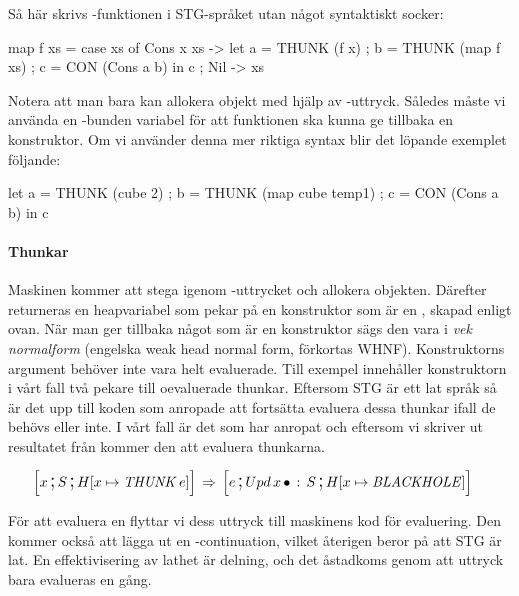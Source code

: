\documentclass[../Core]{subfiles}
\begin{document}
Så här skrivs -funktionen i STG-språket utan något syntaktiskt socker:

\begin{codeEx}
map f xs = case xs of
    { Cons x xs -> let { a = THUNK (f x)
                       ; b = THUNK (map f xs)
                       ; c = CON (Cons a b)
                       } in c
    ; Nil       -> xs
    }
\end{codeEx}

Notera att man bara kan allokera objekt med hjälp av -uttryck. Således
måste vi använda en -bunden variabel  för att funktionen ska kunna ge tillbaka en konstruktor.
Om vi använder denna mer riktiga syntax blir det löpande exemplet följande:

\begin{codeEx}
let { a = THUNK (cube 2)
    ; b = THUNK (map cube temp1)
    ; c = CON (Cons a b)
    } in c
\end{codeEx}

\paragraph{Thunkar} Maskinen kommer att stega igenom -uttrycket och allokera objekten.
Därefter returneras en heapvariabel som pekar på en konstruktor
som är en , skapad enligt ovan. När man ger tillbaka något som är
en konstruktor sägs den vara i \emph{vek normalform} (engelska weak head normal form, förkortas WHNF). Konstruktorns
argument behöver inte vara helt evaluerade. Till exempel innehåller konstruktorn i vårt fall
två pekare till oevaluerade thunkar. Eftersom STG är ett
lat språk så är det upp till koden som anropade  att fortsätta
evaluera dessa thunkar ifall de behövs eller inte. I vårt fall är
det  som har anropat  och eftersom vi skriver ut resultatet från 
kommer den att evaluera thunkarna. 

\begin{align*}
\text{\large$$}\Big[x \,\text{\Large;}\, S \,\text{\Large;}\, & H[x\mapsto\text{\emph{THUNK}}\,e]\Big] \,\Rightarrow\, \text{\large$$}\Big[e \,\text{\Large;}\, Upd\, x\,\bullet \,:\, S \,\text{\Large;}\, H[x\mapsto \text{\emph{BLACKHOLE}}]\Big]
\end{align*}

För att evaluera en  flyttar vi dess uttryck till maskinens kod
för evaluering. Den kommer också att lägga ut en -continuation, vilket
återigen beror på att STG är lat. 
En effektivisering av lathet är delning, och det åstadkoms genom att uttryck
bara evalueras en gång.
\end{document}
